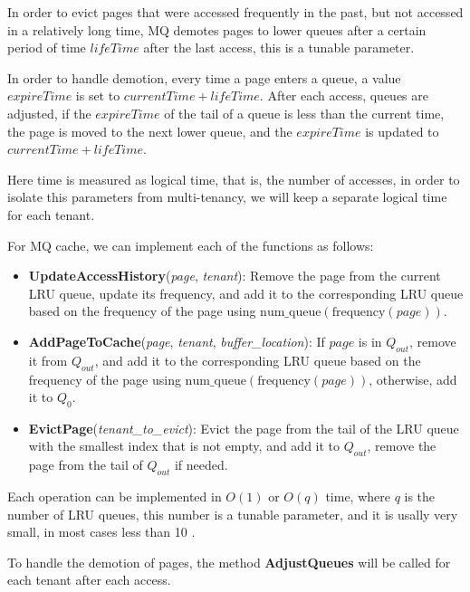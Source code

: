In order to evict pages that were accessed frequently in the past, but not accessed in a relatively long time,
MQ demotes pages to lower queues after a certain period of time $lifeTime$ after the last access, this is
a tunable parameter.

In order to handle demotion, every time a page enters a queue, a value $expireTime$ is set to $currentTime + lifeTime$.
After each access, queues are adjusted, if the $expireTime$ of the tail of a queue is less than the current time, the page
is moved to the next lower queue, and the $expireTime$ is updated to $currentTime + lifeTime$.

Here time is measured as logical time, that is, the number of accesses, in order to isolate 
this parameters from multi-tenancy, we will keep a separate logical time for each tenant.

For MQ cache, we can implement each of the functions as follows:

\begin{itemize}
    \item \textbf{UpdateAccessHistory}(\textit{page}, \textit{tenant}): Remove the page from the
    current LRU queue, update its frequency, and add it to the corresponding LRU queue based on the
    frequency of the page using $\text{num\_queue}(\text{frequency}(page))$.
    \item \textbf{AddPageToCache}(\textit{page}, \textit{tenant}, \textit{buffer\_location}): If 
    $page$ is in $Q_{out}$, remove it from $Q_{out}$, and add it to the corresponding LRU queue based
    on the frequency of the page using $\text{num\_queue}(\text{frequency}(page))$, otherwise, add it
    to $Q_0$.
    \item \textbf{EvictPage}(\textit{tenant\_to\_evict}): Evict the page from the tail of the LRU queue with the
    smallest index that is not empty, and add it to $Q_{out}$, remove the page from the tail of $Q_{out}$ if needed.
\end{itemize}

Each operation can be implemented in $O(1)$ or $O(q)$ time, where $q$ is the number of LRU queues,
this number is a tunable parameter, and it is usally very small, in most cases less than 10 \cite{mq-article}.

To handle the demotion of pages, the method \textbf{AdjustQueues} will be called for each tenant after each access.

